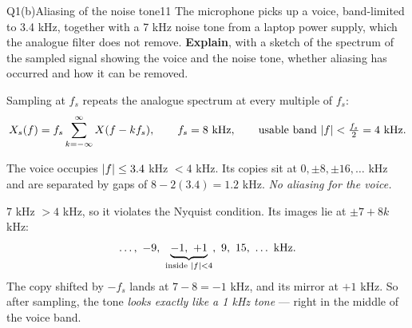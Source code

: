 \begin{qcard}{Q1(b)}{Aliasing of the noise tone}{11}
The microphone picks up a voice, band-limited to 3.4 kHz, together with a 7 kHz noise tone from a laptop power supply, which the analogue filter does not remove. \textbf{Explain}, with a sketch of the spectrum of the sampled signal showing the voice and the noise tone, whether aliasing has occurred and how it can be removed.
\end{qcard}
\begin{solution}
 Sampling at $f_s$ repeats the analogue spectrum at every multiple of $f_s$:
\[X_s(f)=f_s\sum_{k=-\infty}^{\infty}X(f-kf_s),\qquad f_s=8\text{ kHz},\qquad\text{usable band }\lvert f\rvert<\tfrac{f_s}2=4\text{ kHz}.\]

 The voice occupies $\lvert f\rvert\le3.4$ kHz $<4$ kHz. Its copies sit at $0,\pm8,\pm16,\dots$ kHz and are separated by gaps of $8-2(3.4)=1.2$ kHz. \emph{No aliasing for the voice.}

 $7$ kHz $>4$ kHz, so it violates the Nyquist condition. Its images lie at $\pm7+8k$ kHz:
\[\dots,\ -9,\ \underbrace{-1,\ +1}_{\text{inside }\abs f<4},\ 9,\ 15,\ \dots\text{ kHz}.\]
The copy shifted by $-f_s$ lands at $7-8=-1$ kHz, and its mirror at $+1$ kHz. So after sampling, the tone \emph{looks exactly like a 1 kHz tone} --- right in the middle of the voice band.


\end{solution}
